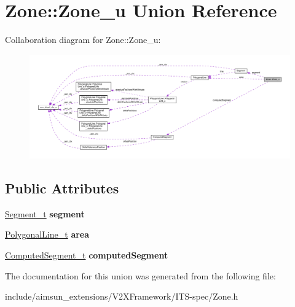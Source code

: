 \hypertarget{unionZone_1_1Zone__u}{}\section{Zone\+:\+:Zone\+\_\+u Union Reference}
\label{unionZone_1_1Zone__u}


Collaboration diagram for Zone\+:\+:Zone\+\_\+u\+:\nopagebreak
\begin{figure}[H]
\begin{center}
\leavevmode
\includegraphics[width=350pt]{unionZone_1_1Zone__u__coll__graph}
\end{center}
\end{figure}
\subsection*{Public Attributes}
\begin{DoxyCompactItemize}
\item 
\hyperlink{structSegment}{Segment\+\_\+t} {\bfseries segment}\hypertarget{unionZone_1_1Zone__u_aac1530b71155c837d74dda523178d3a2}{}\label{unionZone_1_1Zone__u_aac1530b71155c837d74dda523178d3a2}

\item 
\hyperlink{structPolygonalLine}{Polygonal\+Line\+\_\+t} {\bfseries area}\hypertarget{unionZone_1_1Zone__u_af3d6173ed950741ee9dd343d32e6adb9}{}\label{unionZone_1_1Zone__u_af3d6173ed950741ee9dd343d32e6adb9}

\item 
\hyperlink{structComputedSegment}{Computed\+Segment\+\_\+t} {\bfseries computed\+Segment}\hypertarget{unionZone_1_1Zone__u_af2b47f2d3539c0e3109be45ade2d458f}{}\label{unionZone_1_1Zone__u_af2b47f2d3539c0e3109be45ade2d458f}

\end{DoxyCompactItemize}


The documentation for this union was generated from the following file\+:\begin{DoxyCompactItemize}
\item 
include/aimsun\+\_\+extensions/\+V2\+X\+Framework/\+I\+T\+S-\/spec/Zone.\+h\end{DoxyCompactItemize}

